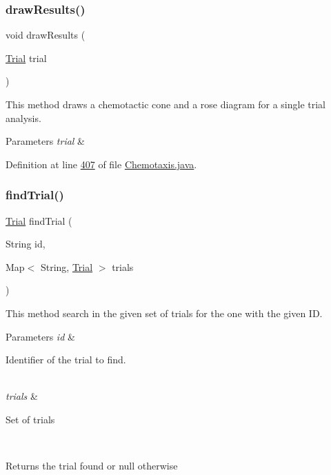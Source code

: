 \subsubsection{\texorpdfstring{draw\+Results()}{drawResults()}}
{\footnotesize\ttfamily void draw\+Results (\begin{DoxyParamCaption}\item[{\hyperlink{classdata_1_1_trial}{Trial}}]{trial }\end{DoxyParamCaption})\hspace{0.3cm}{\ttfamily [private]}}

This method draws a chemotactic cone and a rose diagram for a single trial analysis.


\begin{DoxyParams}{Parameters}
{\em trial} & \\
\hline
\end{DoxyParams}


Definition at line \hyperlink{_chemotaxis_8java_source_l00407}{407} of file \hyperlink{_chemotaxis_8java_source}{Chemotaxis.\+java}.

\hypertarget{classanalysis_1_1_chemotaxis_a40fa55bdb0e1b4e7e0f9de92076ab2f9}{}\label{classanalysis_1_1_chemotaxis_a40fa55bdb0e1b4e7e0f9de92076ab2f9} 
\subsubsection{\texorpdfstring{find\+Trial()}{findTrial()}}
{\footnotesize\ttfamily \hyperlink{classdata_1_1_trial}{Trial} find\+Trial (\begin{DoxyParamCaption}\item[{String}]{id,  }\item[{Map$<$ String, \hyperlink{classdata_1_1_trial}{Trial} $>$}]{trials }\end{DoxyParamCaption})\hspace{0.3cm}{\ttfamily [private]}}

This method search in the given set of trials for the one with the given ID.


\begin{DoxyParams}{Parameters}
{\em id} & 
\begin{DoxyItemize}
\item Identifier of the trial to find. 
\end{DoxyItemize}\\
\hline
{\em trials} & 
\begin{DoxyItemize}
\item Set of trials 
\end{DoxyItemize}\\
\hline
\end{DoxyParams}
\begin{DoxyReturn}{Returns}
the trial found or null otherwise 
\end{DoxyReturn}


